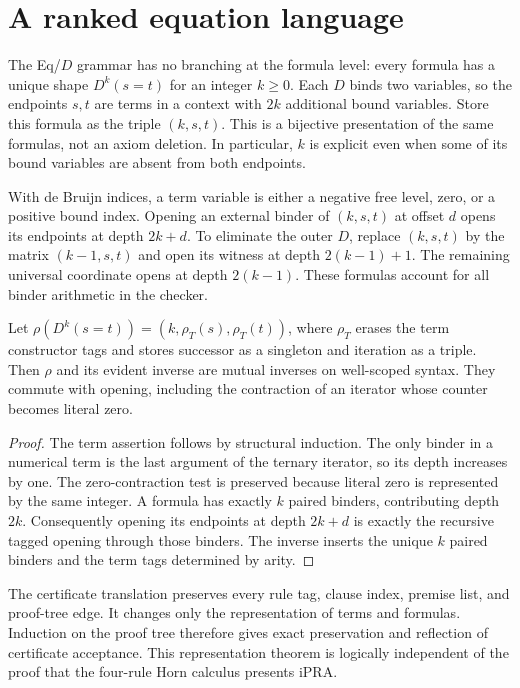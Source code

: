 \section{A ranked equation language}

The Eq/$D$ grammar has no branching at the formula level: every formula
has a unique shape $D^k(s=t)$ for an integer $k\geq0$. Each $D$ binds two
variables, so the endpoints $s,t$ are terms in a context with $2k$ additional
bound variables. Store this formula as the triple $(k,s,t)$.
This is a bijective presentation of the same formulas, not an axiom deletion.
In particular, $k$ is explicit even when some of its bound variables are
absent from both endpoints.

With de Bruijn indices, a term variable is either a negative free level,
zero, or a positive bound index. Opening an external binder of
$(k,s,t)$ at offset $d$ opens its endpoints at depth $2k+d$.
To eliminate the outer $D$, replace $(k,s,t)$ by the matrix
$(k-1,s,t)$ and open its witness at depth $2(k-1)+1$.
The remaining universal coordinate opens at depth $2(k-1)$.
These formulas account for all binder arithmetic in the checker.

\begin{lemma}
Let $\rho(D^k(s=t))=(k,\rho_T(s),\rho_T(t))$, where $\rho_T$
erases the term constructor tags and stores successor as a singleton and
iteration as a triple. Then $\rho$ and its evident inverse are mutual
inverses on well-scoped syntax. They commute with opening, including the
contraction of an iterator whose counter becomes literal zero.
\end{lemma}
\begin{proof}
The term assertion follows by structural induction. The only binder in
a numerical term is the last argument of the ternary iterator, so its
depth increases by one. The zero-contraction test is preserved because
literal zero is represented by the same integer. A formula has exactly
$k$ paired binders, contributing depth $2k$. Consequently opening its
endpoints at depth $2k+d$ is exactly the recursive tagged opening through
those binders. The inverse inserts the unique $k$ paired binders and the
term tags determined by arity.
\end{proof}

The certificate translation preserves every rule tag, clause index,
premise list, and proof-tree edge. It changes only the representation of
terms and formulas. Induction on the proof tree therefore gives exact
preservation and reflection of certificate acceptance. This representation
theorem is logically independent of the proof that the four-rule Horn
calculus presents iPRA.


